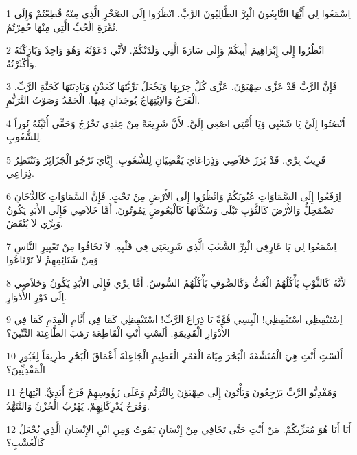 \par 1 اِسْمَعُوا لِي أَيُّهَا التَّابِعُونَ الْبِرَّ الطَّالِبُونَ الرَّبَّ. انْظُرُوا إِلَى الصَّخْرِ الَّذِي مِنْهُ قُطِعْتُمْ وَإِلَى نُقْرَةِ الْجُبِّ الَّتِي مِنْهَا حُفِرْتُمُ.
\par 2 انْظُرُوا إِلَى إِبْرَاهِيمَ أَبِيكُمْ وَإِلَى سَارَةَ الَّتِي وَلَدَتْكُمْ. لأَنِّي دَعَوْتُهُ وَهُوَ وَاحِدٌ وَبَارَكْتُهُ وَأَكْثَرْتُهُ.
\par 3 فَإِنَّ الرَّبَّ قَدْ عَزَّى صِهْيَوْنَ. عَزَّى كُلَّ خِرَبِهَا وَيَجْعَلُ بَرِّيَّتَهَا كَعَدْنٍ وَبَادِيَتَهَا كَجَنَّةِ الرَّبِّ. الْفَرَحُ وَالاِبْتِهَاجُ يُوجَدَانِ فِيهَا. الْحَمْدُ وَصَوْتُ التَّرَنُّمِ.
\par 4 اُنْصُتُوا إِلَيَّ يَا شَعْبِي وَيَا أُمَّتِي اصْغِي إِلَيَّ. لأَنَّ شَرِيعَةً مِنْ عِنْدِي تَخْرُجُ وَحَقِّي أُثَبِّتُهُ نُوراً لِلشُّعُوبِ.
\par 5 قَرِيبٌ بِرِّي. قَدْ بَرَزَ خَلاَصِي وَذِرَاعَايَ يَقْضِيَانِ لِلشُّعُوبِ. إِيَّايَ تَرْجُو الْجَزَائِرُ وَتَنْتَظِرُ ذِرَاعِي.
\par 6 اِرْفَعُوا إِلَى السَّمَاوَاتِ عُيُونَكُمْ وَانْظُرُوا إِلَى الأَرْضِ مِنْ تَحْتٍ. فَإِنَّ السَّمَاوَاتِ كَالدُّخَانِ تَضْمَحِلُّ وَالأَرْضَ كَالثَّوْبِ تَبْلَى وَسُكَّانَهَا كَالْبَعُوضِ يَمُوتُونَ. أَمَّا خَلاَصِي فَإِلَى الأَبَدِ يَكُونُ وَبِرِّي لاَ يُنْقَضُ.
\par 7 اِسْمَعُوا لِي يَا عَارِفِي الْبِرِّ الشَّعْبَ الَّذِي شَرِيعَتِي فِي قَلْبِهِ. لاَ تَخَافُوا مِنْ تَعْيِيرِ النَّاسِ وَمِنْ شَتَائِمِهِمْ لاَ تَرْتَاعُوا
\par 8 لأَنَّهُ كَالثَّوْبِ يَأْكُلُهُمُ الْعُثُّ وَكَالصُّوفِ يَأْكُلُهُمُ السُّوسُ. أَمَّا بِرِّي فَإِلَى الأَبَدِ يَكُونُ وَخَلاَصِي إِلَى دَوْرِ الأَدْوَارِ.
\par 9 اِسْتَيْقِظِي اسْتَيْقِظِي! الْبِسِي قُوَّةً يَا ذِرَاعَ الرَّبِّ! اسْتَيْقِظِي كَمَا فِي أَيَّامِ الْقِدَمِ كَمَا فِي الأَدْوَارِ الْقَدِيمَةِ. أَلَسْتِ أَنْتِ الْقَاطِعَةَ رَهَبَ الطَّاعِنَةَ التِّنِّينَ؟
\par 10 أَلَسْتِ أَنْتِ هِيَ الْمُنَشِّفَةَ الْبَحْرَ مِيَاهَ الْغَمْرِ الْعَظِيمِ الْجَاعِلَةَ أَعْمَاقَ الْبَحْرِ طَرِيقاً لِعُبُورِ الْمَفْدِيِّينَ؟
\par 11 وَمَفْدِيُّو الرَّبِّ يَرْجِعُونَ وَيَأْتُونَ إِلَى صِهْيَوْنَ بِالتَّرَنُّمِ وَعَلَى رُؤُوسِهِمْ فَرَحٌ أَبَدِيٌّ. ابْتِهَاجٌ وَفَرَحٌ يُدْرِكَانِهِمْ. يَهْرُبُ الْحُزْنُ وَالتَّنَهُّدُ.
\par 12 أَنَا أَنَا هُوَ مُعَزِّيكُمْ. مَنْ أَنْتِ حَتَّى تَخَافِي مِنْ إِنْسَانٍ يَمُوتُ وَمِنِ ابْنِ الإِنْسَانِ الَّذِي يُجْعَلُ كَالْعُشْبِ؟
